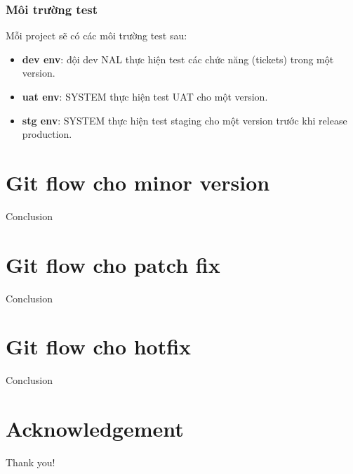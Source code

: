 \documentclass{beamer}
\begin{document}
\begin{frame}
\frametitle{Môi trường test}
Mỗi project sẽ có các môi trường test sau:
\begin{itemize}
\item \textbf{dev env}: đội dev NAL thực hiện test các chức năng (tickets) trong một version.
\item \textbf{uat env}: SYSTEM thực hiện test UAT cho một version.
\item \textbf{stg env}: SYSTEM thực hiện test staging cho một version trước khi release production.
\end{itemize}
\end{frame}

\section{Git flow cho minor version}
    \begin{frame}{Conclusion}
    \end{frame}

\section{Git flow cho patch fix}
    \begin{frame}{Conclusion}
    \end{frame}

\section{Git flow cho hotfix}
    \begin{frame}{Conclusion}
    \end{frame}

\section*{Acknowledgement}
\begin{frame}
\Huge{\centerline{Thank you!}}
\end{frame}
\end{document}
